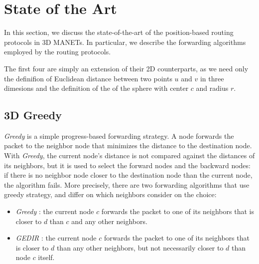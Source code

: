 \documentclass[journal,comsoc]{IEEEtran}
\begin{document}
\section{State of the Art}
In this section, we discuss the state-of-the-art of the position-based routing protocols in 3D MANETs. In particular, we describe the forwarding algorithms employed by the routing protocols. 

The first four are simply an extension of their 2D counterparts, as we need only the definifion of Euclidean distance between two points \(u\) and \(v\) in three dimesions and the definition of the of the sphere with center \(c\) and radius \(r\).

\subsection{3D Greedy}
\emph{Greedy} is a simple progress-based forwarding strategy. A node forwards the packet to the neighbor node that minimizes the distance to the destination node. With \emph{Greedy}, the current node's distance is not compared against the distances of its neighbors, but it is used to select the forward nodes and the backward nodes: if there is no neighbor node closer to the destination node than the current node, the algorithm fails. More precisely, there are two forwarding algorithms that use greedy strategy, and differ
on which neighbors consider on the choice:
\begin{itemize}
\item \emph{Greedy} \cite{finn:greedy}: the current node \(c\) forwards the packet to one of its neighbors that is closer to \(d\) than \(c\) and any other neighbors.
\item \emph{GEDIR} \cite{lin:loop}: the current node \(c\) forwards the packet to one of its neighbors that is closer to \(d\) than any other neighbors, but not necessarily closer to \(d\) than node \(c\) itself.
\end{itemize}
\end{document}

